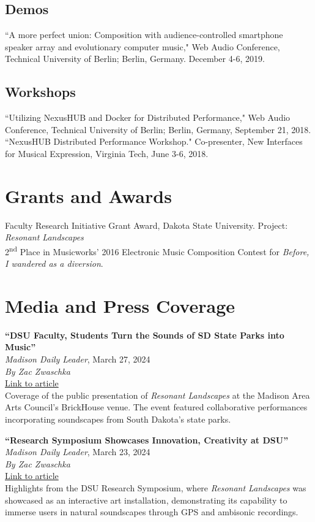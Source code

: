 \documentclass[10pt, a4paper]{article}
\newcommand{\years}[1]{\marginnote{\scriptsize #1}}
\begin{document}
\subsection*{Demos}
\years{2019} ``A more perfect union: Composition with audience-controlled smartphone speaker array and evolutionary computer music," Web Audio Conference, Technical University of Berlin; Berlin, Germany. December 4-6, 2019.

\subsection*{Workshops}
\years{2018} ``Utilizing NexusHUB and Docker for Distributed Performance," Web Audio Conference, Technical University of Berlin; Berlin, Germany, September 21, 2018. \\
``NexusHUB Distributed Performance Workshop." Co-presenter, New Interfaces for Musical Expression, Virginia Tech, June 3-6, 2018.



\section*{Grants and Awards}
\years{2023--24} Faculty Research Initiative Grant Award, Dakota State University. Project: \textit{Resonant Landscapes} \\
\years{2016} 2\textsuperscript{nd} Place in Musicworks’ 2016 Electronic Music Composition Contest for \textit{Before, I wandered as a diversion}. 

\section*{Media and Press Coverage}

\years{2024} \textbf{``DSU Faculty, Students Turn the Sounds of SD State Parks into Music''} \\
\textit{Madison Daily Leader}, March 27, 2024 \\
\textit{By Zac Zwaschka} \\
\href{https://www.madisondailyleader.com/news/local/article_c0bdd132-ec50-11ee-8049-a715d4e9b761.html}{Link to article} \\
Coverage of the public presentation of \textit{Resonant Landscapes} at the Madison Area Arts Council's BrickHouse venue. The event featured collaborative performances incorporating soundscapes from South Dakota's state parks.

\years{2024} \textbf{``Research Symposium Showcases Innovation, Creativity at DSU''} \\
\textit{Madison Daily Leader}, March 23, 2024 \\
\textit{By Zac Zwaschka} \\
\href{https://www.madisondailyleader.com/news/local/article_455caa5e-e85e-11ee-8628-cf0c5c2b7152.html}{Link to article} \\
Highlights from the DSU Research Symposium, where \textit{Resonant Landscapes} was showcased as an interactive art installation, demonstrating its capability to immerse users in natural soundscapes through GPS and ambisonic recordings.
\end{document}
